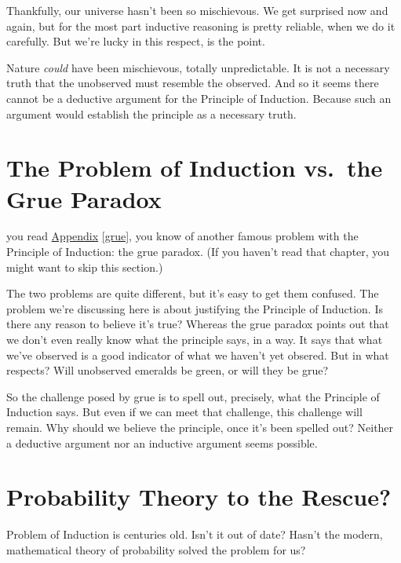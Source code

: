 \documentclass[justified]{tufte-book}
\theoremstyle{definition}
\theoremstyle{definition}
\theoremstyle{definition}
\theoremstyle{remark}
\begin{document}
Thankfully, our universe hasn't been so mischievous. We get surprised now and again, but for the most part inductive reasoning is pretty reliable, when we do it carefully. But we're lucky in this respect, is the point.

Nature \emph{could} have been mischievous, totally unpredictable. It is not a necessary truth that the unobserved must resemble the observed. And so it seems there cannot be a deductive argument for the Principle of Induction. Because such an argument would establish the principle as a necessary truth.

\hypertarget{the-problem-of-induction-vs.the-grue-paradox}{%
\section*{The Problem of Induction vs.~the Grue Paradox}\label{the-problem-of-induction-vs.the-grue-paradox}}

 you read \protect\hyperlink{grue}{Appendix} \ref{grue}, you know of another famous problem with the Principle of Induction: the grue paradox. (If you haven't read that chapter, you might want to skip this section.)

The two problems are quite different, but it's easy to get them confused. The problem we're discussing here is about justifying the Principle of Induction. Is there any reason to believe it's true? Whereas the grue paradox points out that we don't even really know what the principle says, in a way. It says that what we've observed is a good indicator of what we haven't yet obsered. But in what respects? Will unobserved emeralds be green, or will they be grue?

So the challenge posed by grue is to spell out, precisely, what the Principle of Induction says. But even if we can meet that challenge, this challenge will remain. Why should we believe the principle, once it's been spelled out? Neither a deductive argument nor an inductive argument seems possible.

\hypertarget{probability-theory-to-the-rescue}{%
\section*{Probability Theory to the Rescue?}\label{probability-theory-to-the-rescue}}

 Problem of Induction is centuries old. Isn't it out of date? Hasn't the modern, mathematical theory of probability solved the problem for us?
\end{document}
